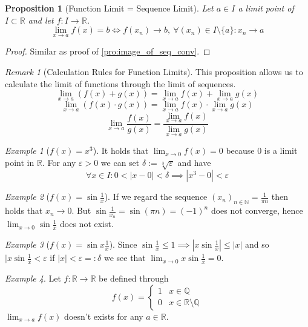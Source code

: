 \documentclass[english,titlepage]{uzhpub}
\theoremstyle{definition}
\theoremstyle{plain}
\newtheorem{proposition}[definition]{Proposition}
\theoremstyle{remark}
\newtheorem*{remark}{Remark}
\theoremstyle{example}
\newtheorem*{example}{Example}
\begin{document}
   \begin{proposition}[Function Limit = Sequence Limit]
      Let \(a \in I\) a limit point of \(I \subset \mathbb{R}\) and let \(f: I \to \mathbb{R}\).
      \[\lim_{x \to a} f(x) = b \iff f(x_n) \to b,~\forall (x_n) \in I \setminus \{a\}: x_n \to a\]
   \end{proposition}
   \begin{proof}
      Similar as proof of \cref{pro:image_of_seq_conv}.
   \end{proof}
   \begin{remark}[Calculation Rules for Function Limits]
      This proposition allows us to calculate the limit of functions through the limit of sequences.
      \[\lim_{x \to a} (f(x) + g(x)) = \lim_{x \to a} f(x) + \lim_{x \to a} g(x)\]
      \[\lim_{x \to a} (f(x) \cdot g(x)) = \lim_{x \to a} f(x) \cdot \lim_{x \to a} g(x)\]
      \[\lim_{x \to a} \frac{f(x)}{g(x)} = \frac{\lim_{x \to a} f(x)}{\lim_{x \to a} g(x)}\]
   \end{remark}
   \begin{example}[\(f(x) = x^3\)]
      It holds that \(\lim_{x \to 0} f(x) = 0\) because 0 is a limit point in \(\mathbb{R}\).
      For any \(\varepsilon > 0\) we can set \(\delta := \sqrt[3]{\varepsilon}\) and have
      \[\forall x \in I: 0 < |x - 0| < \delta \implies |x^3 - 0| < \varepsilon\]
   \end{example}
   \begin{example}[\(f(x) = \sin \frac{1}{x}\)]
      If we regard the sequence \((x_n)_{n \in \mathbb{N}} = \frac{1}{\pi n}\) then holds that \(x_n \to 0\).
      But \(\sin \frac{1}{x_n} = \sin(\pi n) = (-1)^n\) does not converge, hence \(\lim_{x \to 0} \sin \frac{1}{x}\) does not exist.
   \end{example}
   \begin{example}[\(f(x) = \sin x \frac{1}{x}\)]
      Since \(\sin \frac{1}{x} \leq 1 \implies |x \sin \frac{1}{x}| \leq |x|\) and so \(|x \sin \frac{1}{x} < \varepsilon\) if \(|x| < \varepsilon =: \delta\) we see that \(\lim_{x \to 0} x \sin \frac{1}{x} = 0\).
   \end{example}
   \begin{example}
      Let \(f: \mathbb{R} \to \mathbb{R}\) be defined through
      \[f(x) = \begin{cases}1 & x \in \mathbb{Q}\\ 0& x \in \mathbb{R} \setminus \mathbb{Q}\end{cases}\]
      \(\lim_{x \to a} f(x)\) doesn't exists for any \(a \in \mathbb{R}\).
   \end{example}
\end{document}
